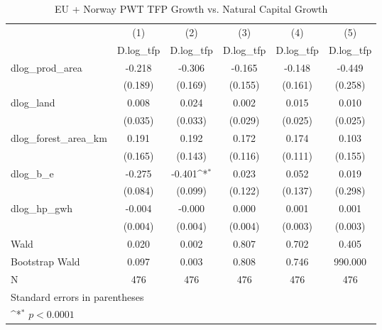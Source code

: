 \begin{table}[htbp]\centering
\def\sym#1{\ifmmode^{#1}\else\(^{#1}\)\fi}
\caption{EU + Norway PWT TFP Growth vs. Natural Capital Growth}
\begin{tabular}{l*{5}{c}}
\hline\hline
            &\multicolumn{1}{c}{(1)}&\multicolumn{1}{c}{(2)}&\multicolumn{1}{c}{(3)}&\multicolumn{1}{c}{(4)}&\multicolumn{1}{c}{(5)}\\
            &\multicolumn{1}{c}{D.log\_tfp}&\multicolumn{1}{c}{D.log\_tfp}&\multicolumn{1}{c}{D.log\_tfp}&\multicolumn{1}{c}{D.log\_tfp}&\multicolumn{1}{c}{D.log\_tfp}\\
\hline
dlog\_prod\_area&      -0.218       &      -0.306       &      -0.165       &      -0.148       &      -0.449       \\
            &     (0.189)       &     (0.169)       &     (0.155)       &     (0.161)       &     (0.258)       \\
[1em]
dlog\_land   &       0.008       &       0.024       &       0.002       &       0.015       &       0.010       \\
            &     (0.035)       &     (0.033)       &     (0.029)       &     (0.025)       &     (0.025)       \\
[1em]
dlog\_forest\_area\_km&       0.191       &       0.192       &       0.172       &       0.174       &       0.103       \\
            &     (0.165)       &     (0.143)       &     (0.116)       &     (0.111)       &     (0.155)       \\
[1em]
dlog\_b\_e    &      -0.275       &      -0.401\sym{*}&       0.023       &       0.052       &       0.019       \\
            &     (0.084)       &     (0.099)       &     (0.122)       &     (0.137)       &     (0.298)       \\
[1em]
dlog\_hp\_gwh &      -0.004       &      -0.000       &       0.000       &       0.001       &       0.001       \\
            &     (0.004)       &     (0.004)       &     (0.004)       &     (0.003)       &     (0.003)       \\
\hline
Wald        &       0.020       &       0.002       &       0.807       &       0.702       &       0.405       \\
Bootstrap Wald&       0.097       &       0.003       &       0.808       &       0.746       &     990.000       \\
N           &         476       &         476       &         476       &         476       &         476       \\
\hline\hline
\multicolumn{6}{l}{\footnotesize Standard errors in parentheses}\\
\multicolumn{6}{l}{\footnotesize \sym{*} \(p<0.0001\)}\\
\end{tabular}
\end{table}
